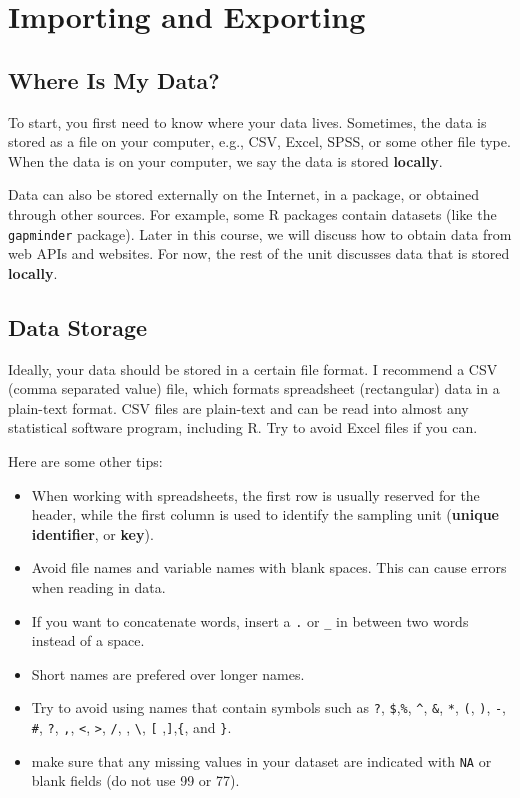 \documentclass[]{book}
\providecommand{\tightlist}{%
  \setlength{\itemsep}{0pt}\setlength{\parskip}{0pt}}
\begin{document}
\section{Importing and Exporting}\label{importing-and-exporting}

\subsection{Where Is My Data?}\label{where-is-my-data}

To start, you first need to know where your data lives. Sometimes, the
data is stored as a file on your computer, e.g., CSV, Excel, SPSS, or
some other file type. When the data is on your computer, we say the data
is stored \textbf{locally}.

Data can also be stored externally on the Internet, in a package, or
obtained through other sources. For example, some R packages contain
datasets (like the \texttt{gapminder} package). Later in this course, we
will discuss how to obtain data from web APIs and websites. For now, the
rest of the unit discusses data that is stored \textbf{locally}.

\subsection{Data Storage}\label{data-storage}

Ideally, your data should be stored in a certain file format. I
recommend a CSV (comma separated value) file, which formats spreadsheet
(rectangular) data in a plain-text format. CSV files are plain-text and
can be read into almost any statistical software program, including R.
Try to avoid Excel files if you can.

Here are some other tips:

\begin{itemize}
\tightlist
\item
  When working with spreadsheets, the first row is usually reserved for
  the header, while the first column is used to identify the sampling
  unit (\textbf{unique identifier}, or \textbf{key}).
\item
  Avoid file names and variable names with blank spaces. This can cause
  errors when reading in data.
\item
  If you want to concatenate words, insert a \texttt{.} or \texttt{\_}
  in between two words instead of a space.
\item
  Short names are prefered over longer names.
\item
  Try to avoid using names that contain symbols such as \texttt{?},
  \texttt{\$},\texttt{\%}, \texttt{\^{}}, \texttt{\&}, \texttt{*},
  \texttt{(}, \texttt{)}, \texttt{-}, \texttt{\#}, \texttt{?},
  \texttt{,}, \texttt{\textless{}}, \texttt{\textgreater{}}, \texttt{/},
  \texttt{\textbar{}}, \texttt{\textbackslash{}}, \texttt{{[}}
  ,\texttt{{]}},\texttt{\{}, and \texttt{\}}.
\item
  make sure that any missing values in your dataset are indicated with
  \texttt{NA} or blank fields (do not use 99 or 77).
\end{itemize}
\end{document}
